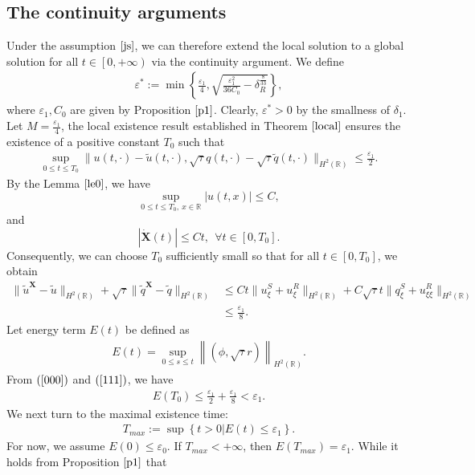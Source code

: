 \documentclass[10pt,reqno]{amsart}
\numberwithin{equation}{section}
\begin{document}
	\subsection{The continuity arguments}
	Under the assumption $\eqref{js}$, we can therefore extend the local solution to a global solution for all $t\in\left[0,+\infty\right)$ via the continuity argument. We define
	\begin{align*}
		\varepsilon^{*}:=\min\left\{\frac{\varepsilon_{1}}{4},\sqrt{\frac{\varepsilon_{1}^2}{36C_0}-\delta_R^{\frac{8}{33}}}\right\},
	\end{align*}
	where $\varepsilon_1,C_0$ are given by Proposition $\ref{p1}$. Clearly, $\varepsilon^*>0$ by the smallness of $\delta_{1}$. Let $M=\frac{\varepsilon_1}{4}$, the local existence result established in Theorem $\ref{local}$ ensures the existence of a positive constant $T_0$ such that 
	\begin{align}\label{000}
		\sup_{0\leq t\leq T_0} \|u(t,\cdot)-\tilde{u}(t,\cdot), \sqrt{\tau}q(t,\cdot)-\sqrt{\tau}\tilde{q}(t,\cdot)\|_{H^2(\mathbb{R})} \leq \frac{\varepsilon_1}{2}.
	\end{align}
	By the Lemma $\ref{le0}$, we have $$\sup_{0\leq t\leq T_0,\ x\in\mathbb{R}}|u(t,x)|\leq C,$$ 
	and 
	$$|\dot{\mathbf{X}}(t)|\leq Ct,\ \ \forall t\in[0,T_0].$$
	Consequently, we can choose $T_0$ sufficiently small so that for all $t\in[0,T_0]$, we obtain
	\begin{align}\label{111}
		\lVert\tilde{u}^{\mathbf{X}}-\tilde{u}\rVert_{H^2(\mathbb{R})}+\sqrt{\tau}\lVert\tilde{q}^{\mathbf{X}}-\tilde{q}\rVert_{H^2(\mathbb{R})}
		&\leq Ct\lVert u_{\xi}^S+u_{\xi}^R\rVert_{H^2(\mathbb{R})}+C\sqrt{\tau}t\lVert q_{\xi}^S+u_{\xi\xi}^R\rVert_{H^2(\mathbb{R})}\nonumber\\
		&\leq \frac{\varepsilon_1}{8}.
	\end{align}
	Let energy term $E(t)$ be defined as
	\begin{align*}
		E(t)=\sup_{0\leq s\leq t}\left\lVert\left(\phi,\sqrt{\tau}r\right)\right\rVert_{H^2(\mathbb{R})}.
	\end{align*}
	From $(\ref{000})$ and $(\ref{111})$, we have 
	\begin{align*}
		E(T_0)\leq \frac{\varepsilon_{1}}{2}+\frac{\varepsilon_1}{8}<\varepsilon_1.
	\end{align*}
	We next turn to the maximal existence time:
	\begin{align*}
		T_{max}:=\sup\left\{t>0|E(t)\leq \varepsilon_1\right\}.
	\end{align*}
	For now, we assume $E(0)\leq \varepsilon_0$. If $T_{max}<+\infty$, then $E(T_{max})=\varepsilon_1.$ While it holds from Proposition $\ref{p1}$ that
\end{document}
